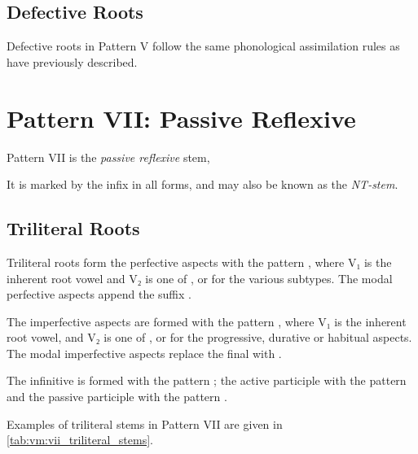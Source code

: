 \documentclass[grammar]{subfiles}
\begin{document}
\subsection{Defective Roots}
\label{ssec:vm:vi_defective_roots}

Defective roots in Pattern V follow the same phonological assimilation rules
as have previously described. 


\clearpage
\section{Pattern VII: Passive Reflexive}
\label{sec:vm:pattern_vii}

Pattern VII is the \emph{passive reflexive} stem, 
%

It is marked by the infix  in all forms, and may also be known as the \emph{NT-stem}.


\subsection{Triliteral Roots}
\label{ssec:vm:vii_triliteral_roots}

Triliteral roots form the perfective aspects with the pattern
, where V₁ is the inherent root vowel and V₂ is one of
,  or  for the various subtypes.  The modal perfective
aspects append the suffix .

The imperfective aspects are formed with the pattern ,
where V₁ is the inherent root vowel, and V₂ is one of ,  or
 for the progressive, durative or habitual aspects.  The modal
imperfective aspects replace the final  with .

The infinitive is formed with the pattern ; the active participle
with the pattern  and the passive participle with the pattern
. 

Examples of triliteral stems in Pattern VII are given in \cref{tab:vm:vii_triliteral_stems}. 
\end{document}
